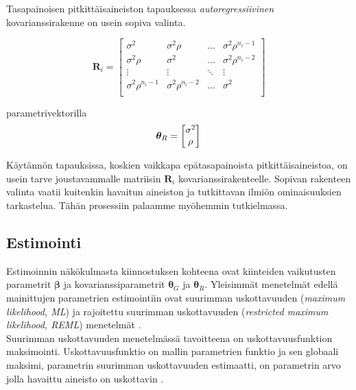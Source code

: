 \documentclass[finnish]{docopts}
\begin{document}
Tasapainoisen pitkittäisaineiston tapauksessa \textit{autoregressiivinen} kovarianssirakenne on usein sopiva valinta.

$$
\bm{R}_i =
\begin{bmatrix}
\sigma^2 & \sigma^2 \rho & \dots  & \sigma^2 \rho^{n_i -1} \\
\sigma^2 \rho   & \sigma^2      & \dots & \sigma^2 \rho^{n_i -2} \\
\vdots   & \vdots        & \ddots & \vdots \\
\sigma^2 \rho^{n_i -1} & \sigma^2 \rho^{n_i -2} & \dots & \sigma^2 \\
\end{bmatrix}
$$

parametrivektorilla \\

$$
\bm{\theta}_R =
\begin{bmatrix}
\sigma^2\\
\rho \\
\end{bmatrix}\\
$$

Käytännön tapauksissa, koskien vaikkapa epätasapainoista pitkittäisaineistoa, on usein tarve joustavammalle matriisin $\bm{R}_i$ kovarianssirakenteelle. Sopivan rakenteen valinta vaatii kuitenkin havaitun aineiston ja tutkittavan ilmiön ominaisuuksien tarkastelua. Tähän prosessiin palaamme myöhemmin tutkielmassa.\\

\subsection{Estimointi}
\label{sub:estimointi}

Estimoinnin näkökulmasta kiinnostuksen kohteena ovat kiinteiden vaikutusten parametrit $\bm{\beta}$ ja kovarianssiparametrit $\bm{\theta}_G$ ja $\bm{\theta}_R$. Yleisimmät menetelmät edellä mainittujen parametrien estimointiin ovat suurimman uskottavuuden (\textit{maximum likelihood, ML}) ja rajoitettu suurimman uskottavuuden (\textit{restricted maximum likelihood, REML}) menetelmät \cite{west14}. \\

Suurimman uskottavuuden menetelmässä tavoitteena on uskottavuusfunktion maksimointi. Uskottavuusfunktio on mallin parametrien funktio ja sen globaali maksimi, parametrin suurimman uskottavuuden estimaatti, on parametrin arvo jolla havaittu aineisto on uskottavin \cite{casella02}. \\
\end{document}
